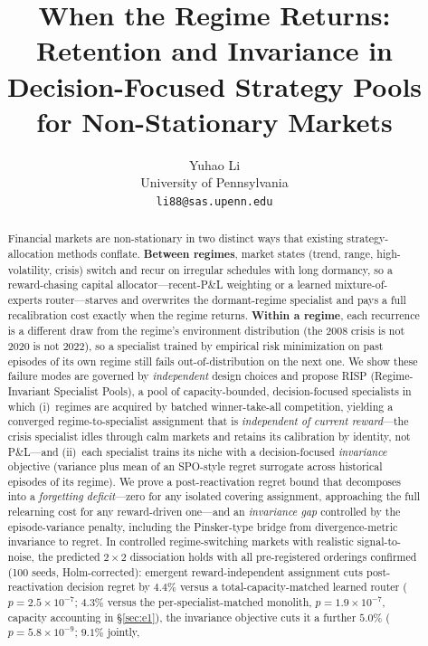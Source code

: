 \documentclass{article}
\title{When the Regime Returns:\\
Retention and Invariance in Decision-Focused Strategy Pools\\
for Non-Stationary Markets}
\author{
  Yuhao Li\\
  University of Pennsylvania \\
  \texttt{li88@sas.upenn.edu}
}
\newcommand{\nm}{\textsc{RISP}}
\begin{document}
\maketitle

\begin{abstract}
Financial markets are non-stationary in two distinct ways that existing
strategy-allocation methods conflate. \textbf{Between regimes}, market states
(trend, range, high-volatility, crisis) switch and recur on irregular
schedules with long dormancy, so a reward-chasing capital allocator---recent-P\&L
weighting or a learned mixture-of-experts router---starves and overwrites the
dormant-regime specialist and pays a full recalibration cost exactly when the
regime returns. \textbf{Within a regime}, each recurrence is a different draw
from the regime's environment distribution (the 2008 crisis is not 2020 is not
2022), so a specialist trained by empirical risk minimization on past episodes
of its own regime still fails out-of-distribution on the next one. We show
these failure modes are governed by \emph{independent} design choices and
propose \nm{} (Regime-Invariant Specialist Pools), a pool of capacity-bounded,
decision-focused specialists in which (i)~regimes are acquired by batched
winner-take-all competition, yielding a converged regime-to-specialist
assignment that is \emph{independent of current reward}---the crisis
specialist idles through calm markets and retains its calibration by identity,
not P\&L---and (ii)~each specialist trains its niche with a decision-focused
\emph{invariance} objective (variance plus mean of an SPO-style regret
surrogate across historical episodes of its regime). We prove a
post-reactivation regret bound that decomposes into a \emph{forgetting
deficit}---zero for any isolated covering assignment, approaching the full
relearning cost for any reward-driven one---and an \emph{invariance gap}
controlled by the episode-variance penalty, including the
Pinsker-type bridge from divergence-metric invariance to regret. In controlled
regime-switching markets with realistic signal-to-noise, the predicted
$2{\times}2$ dissociation holds with all pre-registered orderings confirmed
(100 seeds, Holm-corrected): emergent reward-independent assignment cuts
post-reactivation decision regret by $4.4\%$ versus a total-capacity-matched
learned router ($p{=}2.5{\times}10^{-7}$; $4.3\%$ versus the
per-specialist-matched monolith, $p{=}1.9{\times}10^{-7}$, capacity
accounting in \S\ref{sec:e1}), the invariance objective cuts it a
further $5.0\%$ ($p{=}5.8{\times}10^{-9}$; $9.1\%$ jointly,

\end{abstract}
\end{document}
